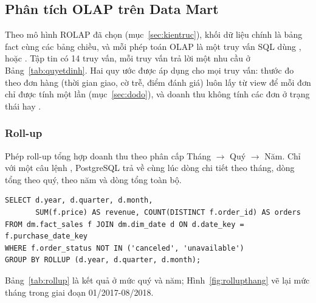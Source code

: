 \subsection{Phân tích OLAP trên Data Mart}\label{sec:olap}

Theo mô hình ROLAP đã chọn (mục~\ref{sec:kientruc}), khối dữ liệu chính là bảng fact  cùng các bảng chiều, và mỗi phép toán OLAP là một truy vấn SQL dùng ,  hoặc . Tập tin  có 14 truy vấn, mỗi truy vấn trả lời một nhu cầu ở Bảng~\ref{tab:quyetdinh}. Hai quy ước được áp dụng cho mọi truy vấn: thước đo theo đơn hàng (thời gian giao, cờ trễ, điểm đánh giá) luôn lấy từ view  để mỗi đơn chỉ được tính một lần (mục~\ref{sec:dodo}), và doanh thu không tính các đơn ở trạng thái  hay .

\subsubsection{Roll-up}

Phép roll-up tổng hợp doanh thu theo phân cấp Tháng $\rightarrow$ Quý $\rightarrow$ Năm. Chỉ với một câu lệnh , PostgreSQL trả về cùng lúc dòng chi tiết theo tháng, dòng tổng theo quý, theo năm và dòng tổng toàn bộ.

\begin{lstlisting}[style=SQLStyle]
SELECT d.year, d.quarter, d.month,
       SUM(f.price) AS revenue, COUNT(DISTINCT f.order_id) AS orders
FROM dm.fact_sales f JOIN dm.dim_date d ON d.date_key = f.purchase_date_key
WHERE f.order_status NOT IN ('canceled', 'unavailable')
GROUP BY ROLLUP (d.year, d.quarter, d.month);
\end{lstlisting}

Bảng~\ref{tab:rollup} là kết quả ở mức quý và năm; Hình~\ref{fig:rollupthang} vẽ lại mức tháng trong giai đoạn 01/2017-08/2018.

